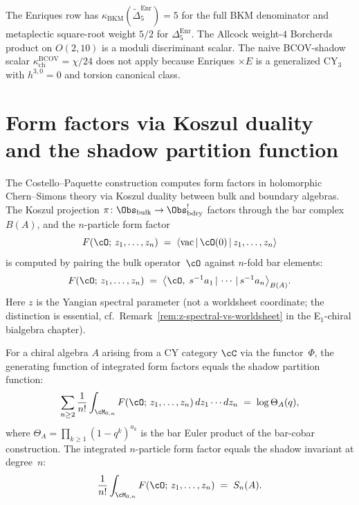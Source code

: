 \begin{remark}
\label{rem:enriques-kappa-anomaly}
The Enriques row has
\(\kappa_{\mathrm{BKM}}(\widetilde\Delta^{\mathrm{Enr}}_5)=5\) for the
full BKM denominator and metaplectic square-root weight \(5/2\) for
\(\Delta^{\mathrm{Enr}}_5\). The Allcock weight-$4$ Borcherds product on
\(O(2,10)\) is a moduli discriminant scalar. The naive BCOV-shadow scalar
\(\kappa_{\mathrm{ch}}^{\mathrm{BCOV}}=\chi/24\) does not apply because
Enriques \(\times E\) is a generalized CY$_3$ with \(h^{3,0}=0\) and
torsion canonical class.
\end{remark}



\section{Form factors via Koszul duality and the shadow partition function}
\label{sec:form-factors-shadow-pf}

The Costello--Paquette construction computes form factors in holomorphic Chern--Simons theory via Koszul duality between bulk and boundary algebras. The Koszul projection $\pi \colon \Obs_{\mathrm{bulk}} \to \Obs_{\mathrm{bdry}}^!$ factors through the bar complex $B(A)$, and the $n$-particle form factor
\[
 F(\cO;\, z_1, \ldots, z_n) \;=\; \langle \mathrm{vac} \,|\, \cO(0) \,|\, z_1, \ldots, z_n \rangle
\]
is computed by pairing the bulk operator~$\cO$ against $n$-fold bar elements:
\[
 F(\cO;\, z_1, \ldots, z_n)
 \;=\; \bigl\langle \cO,\; s^{-1}a_1 \,|\, \cdots \,|\, s^{-1}a_n \bigr\rangle_{B(A)}.
\]
Here $z$ is the Yangian spectral parameter (not a worldsheet coordinate; the distinction is essential, cf.\ Remark~\ref{rem:z-spectral-vs-worldsheet} in the E$_1$-chiral bialgebra chapter).

\begin{conjecture}
\label{conj:ff-shadow-identity}
\ClaimStatusConjectured
For a chiral algebra $A$ arising from a CY category $\cC$ via the functor~$\Phi$, the generating function of integrated form factors equals the shadow partition function:
\[
 \sum_{n \geq 2} \frac{1}{n!} \int_{\cM_{0,n}} F(\cO;\, z_1, \ldots, z_n)\, dz_1 \cdots dz_n
 \;=\; \log \Theta_A(q),
\]
where $\Theta_A = \prod_{k \geq 1} (1 - q^k)^{a_k}$ is the bar Euler product of the bar-cobar construction. The integrated $n$-particle form factor equals the shadow invariant at degree~$n$:
\[
 \frac{1}{n!} \int_{\cM_{0,n}} F(\cO;\, z_1, \ldots, z_n)
 \;=\; S_n(A).
\]
\end{conjecture}

